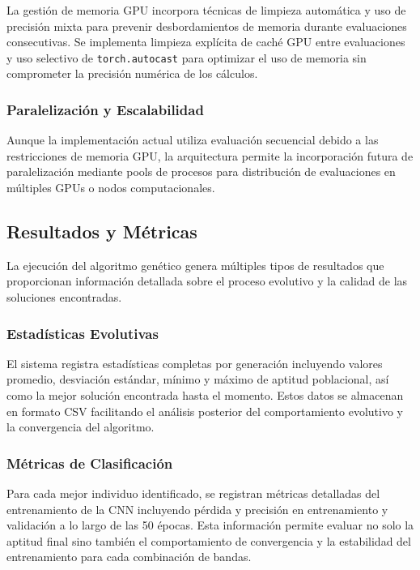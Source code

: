 La gestión de memoria GPU incorpora técnicas de limpieza automática y uso de precisión mixta para prevenir desbordamientos de memoria durante evaluaciones consecutivas. Se implementa limpieza explícita de caché GPU entre evaluaciones y uso selectivo de \texttt{torch.autocast} para optimizar el uso de memoria sin comprometer la precisión numérica de los cálculos.

\subsubsection{Paralelización y Escalabilidad}

Aunque la implementación actual utiliza evaluación secuencial debido a las restricciones de memoria GPU, la arquitectura permite la incorporación futura de paralelización mediante pools de procesos para distribución de evaluaciones en múltiples GPUs o nodos computacionales.

\subsection{Resultados y Métricas}

La ejecución del algoritmo genético genera múltiples tipos de resultados que proporcionan información detallada sobre el proceso evolutivo y la calidad de las soluciones encontradas.

\subsubsection{Estadísticas Evolutivas}

El sistema registra estadísticas completas por generación incluyendo valores promedio, desviación estándar, mínimo y máximo de aptitud poblacional, así como la mejor solución encontrada hasta el momento. Estos datos se almacenan en formato CSV facilitando el análisis posterior del comportamiento evolutivo y la convergencia del algoritmo.

\subsubsection{Métricas de Clasificación}

Para cada mejor individuo identificado, se registran métricas detalladas del entrenamiento de la CNN incluyendo pérdida y precisión en entrenamiento y validación a lo largo de las 50 épocas. Esta información permite evaluar no solo la aptitud final sino también el comportamiento de convergencia y la estabilidad del entrenamiento para cada combinación de bandas.


